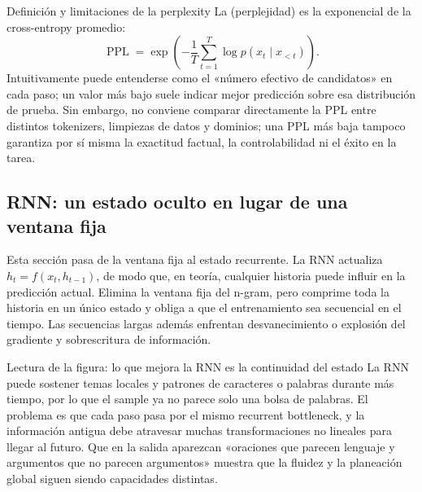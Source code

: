 \begin{knowledgebox}{Definición y limitaciones de la perplexity}
La  (perplejidad) es la exponencial de la cross-entropy promedio:
\[
\operatorname{PPL}=\exp\!\left(-\frac{1}{T}\sum_{t=1}^{T}\log p(x_t\mid x_{<t})\right).
\]
Intuitivamente puede entenderse como el «número efectivo de candidatos» en cada paso; un valor más bajo suele indicar mejor predicción sobre esa distribución de prueba. Sin embargo, no conviene comparar directamente la PPL entre distintos tokenizers, limpiezas de datos y dominios; una PPL más baja tampoco garantiza por sí misma la exactitud factual, la controlabilidad ni el éxito en la tarea.
\end{knowledgebox}

\subsection{RNN: un estado oculto en lugar de una ventana fija}

Esta sección pasa de la ventana fija al estado recurrente. La RNN actualiza $h_t=f(x_t,h_{t-1})$, de modo que, en teoría, cualquier historia puede influir en la predicción actual. Elimina la ventana fija del n-gram, pero comprime toda la historia en un único estado y obliga a que el entrenamiento sea secuencial en el tiempo. Las secuencias largas además enfrentan desvanecimiento o explosión del gradiente y sobrescritura de información.


\begin{knowledgebox}{Lectura de la figura: lo que mejora la RNN es la continuidad del estado}
La RNN puede sostener temas locales y patrones de caracteres o palabras durante más tiempo, por lo que el sample ya no parece solo una bolsa de palabras. El problema es que cada paso pasa por el mismo recurrent bottleneck, y la información antigua debe atravesar muchas transformaciones no lineales para llegar al futuro. Que en la salida aparezcan «oraciones que parecen lenguaje y argumentos que no parecen argumentos» muestra que la fluidez y la planeación global siguen siendo capacidades distintas.
\end{knowledgebox}


